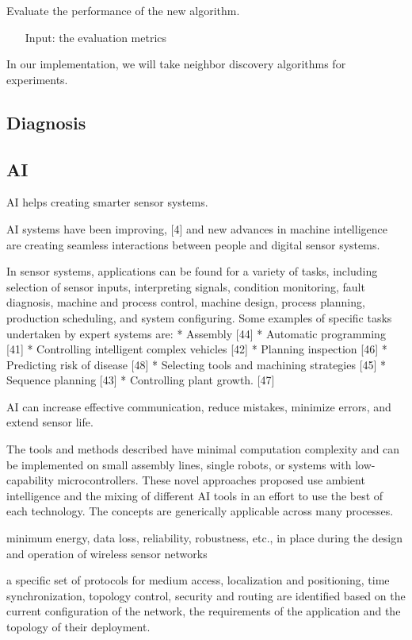 Evaluate the performance of the new algorithm.
\begin{itemize}
\item[Input:] the evaluation metrics
\end{itemize}

In our implementation, we will take neighbor discovery algorithms for experiments.

\subsection{Diagnosis}

\subsection{AI}

AI helps creating smarter sensor systems.

AI systems have been improving, [4] and new advances in machine intelligence are creating seamless interactions between people and digital sensor systems.

 In sensor systems, applications can be found for a variety of tasks, including selection of sensor inputs, interpreting signals, condition monitoring, fault diagnosis, machine and process control, machine design, process planning, production scheduling, and system configuring. Some examples of specific tasks undertaken by expert systems are:
* Assembly [44]
* Automatic programming [41]
* Controlling intelligent complex vehicles [42] * Planning inspection [46]
* Predicting risk of disease [48]
* Selecting tools and machining strategies [45]
* Sequence planning [43]
* Controlling plant growth. [47]

AI can increase effective communication, reduce mistakes, minimize errors, and extend sensor life.



The tools and methods described have minimal computation complexity and can be implemented on small assembly lines, single robots, or systems with low-capability microcontrollers. These novel approaches proposed use ambient intelligence and the mixing of different AI tools in an effort to use the best of each technology. The concepts are generically applicable across many processes.


minimum energy, data loss, reliability, robustness, etc., in place during the design and operation of wireless sensor networks

a specific set of protocols for medium access, localization and positioning, time synchronization, topology control, security and routing are identified based on the current configuration of the network, the requirements of the application and the topology of their deployment.


